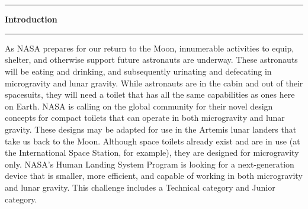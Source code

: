 \pagebreak
\chapter[Introduction]{}\vspace{-2cm}\noindent\rule{\textwidth}{2.5pt}
\thispagestyle{empty}

\vspace{5cm}\textbf{\huge{Introduction}}

\medskip\noindent\rule{\textwidth}{1pt}

As NASA prepares for our return to the Moon, innumerable activities to equip, shelter, and otherwise support future astronauts are underway.  These astronauts will be eating and drinking, and subsequently urinating and defecating in microgravity and lunar gravity.  While astronauts are in the cabin and out of their spacesuits, they will need a toilet that has all the same capabilities as ones here on Earth. NASA is calling on the global community for their novel design concepts for compact toilets that can operate in both microgravity and lunar gravity.  These designs may be adapted for use in the Artemis lunar landers that take us back to the Moon.  Although space toilets already exist and are in use (at the International Space Station, for example), they are designed for microgravity only.  NASA’s Human Landing System Program is looking for a next-generation device that is smaller, more efficient, and capable of working in both microgravity and lunar gravity. This challenge includes a Technical category and Junior category.